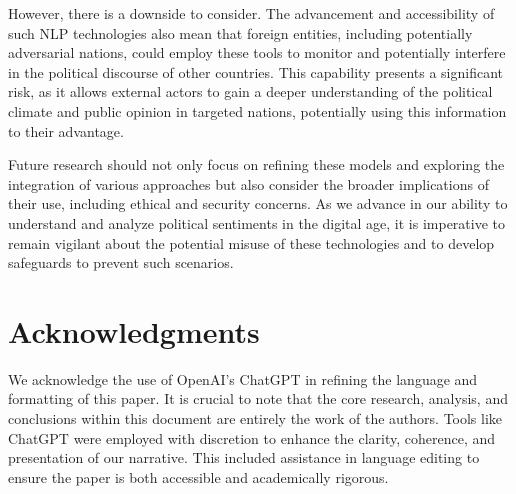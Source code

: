 \documentclass[10pt]{article}
\begin{document}
\begin{multicols}{2}
However, there is a downside to consider. The advancement and accessibility of such NLP technologies also mean that foreign entities, including potentially adversarial nations, could employ these tools to monitor and potentially interfere in the political discourse of other countries. This capability presents a significant risk, as it allows external actors to gain a deeper understanding of the political climate and public opinion in targeted nations, potentially using this information to their advantage.

Future research should not only focus on refining these models and exploring the integration of various approaches but also consider the broader implications of their use, including ethical and security concerns. As we advance in our ability to understand and analyze political sentiments in the digital age, it is imperative to remain vigilant about the potential misuse of these technologies and to develop safeguards to prevent such scenarios.


\section*{Acknowledgments}

 We acknowledge the use of OpenAI's ChatGPT in refining the language and formatting of this paper. It is crucial to note that the core research, analysis, and conclusions within this document are entirely the work of the authors. Tools like ChatGPT were employed with discretion to enhance the clarity, coherence, and presentation of our narrative. This included assistance in language editing to ensure the paper is both accessible and academically rigorous.

\begin{center}
    \printbibliography[title={\fontsize{10}{12}\selectfont REFERENCES}, heading=bibintoc]
\end{center}







\end{multicols}
\end{document}
